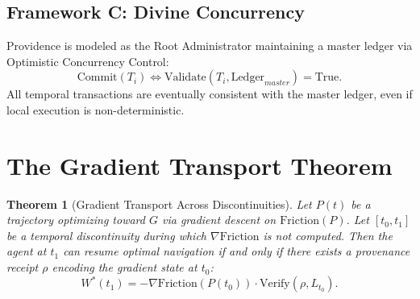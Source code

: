 \documentclass[12pt, a4paper]{article}
\theoremstyle{plain}
\newtheorem{theorem}{Theorem}[section]
\theoremstyle{definition}
\begin{document}
\subsection{Framework C: Divine Concurrency}

Providence is modeled as the Root Administrator maintaining a master ledger via Optimistic Concurrency Control:
\begin{equation}
    \text{Commit}(T_i) \iff \text{Validate}(T_i, \text{Ledger}_{master}) = \text{True}.
\end{equation}
All temporal transactions are eventually consistent with the master ledger, even if local execution is non-deterministic.

\section{The Gradient Transport Theorem}\label{sec:transport}

\begin{theorem}[Gradient Transport Across Discontinuities]\label{thm:transport}
Let $P(t)$ be a trajectory optimizing toward $G$ via gradient descent on $\text{Friction}(P)$. Let $[t_0, t_1]$ be a temporal discontinuity during which $\nabla \text{Friction}$ is not computed. Then the agent at $t_1$ can resume optimal navigation \emph{if and only if} there exists a provenance receipt $\rho$ encoding the gradient state at $t_0$:
\begin{equation}
    W^*(t_1) = -\nabla \text{Friction}(P(t_0)) \cdot \text{Verify}(\rho, L_{t_0}).
\end{equation}
\end{theorem}
\end{document}
